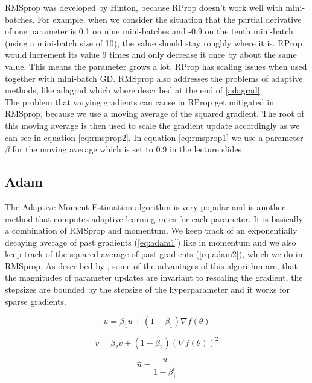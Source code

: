 \documentclass[aodsor,preprint]{imsart}
\numberwithin{equation}{section}
\theoremstyle{plain}
\begin{document}
RMSprop was developed by Hinton, because RProp doesn't work well with mini-batches. For example, when we consider the situation that the partial derivative of one parameter is 0.1 on nine mini-batches and -0.9 on the tenth mini-batch (using a mini-batch size of 10), the value should stay roughly where it is. RProp would increment its value 9 times and only decrease it once by about the same value. This means the parameter grows a lot, RProp has scaling issues when used together with mini-batch GD. RMSprop also addresses the problems of adaptive methods, like adagrad which where described at the end of \ref{adagrad}. \\
The problem that varying gradients can cause in RProp get mitigated in RMSprop, because we use a moving average of the squared gradient. The root of this moving average is then used to scale the gradient update accordingly as we can see in equation \ref{eq:rmsprop2}. In equation \ref{eq:rmsprop1} we use a parameter $\beta$ for the moving average which is set to 0.9 in the lecture slides.

\subsection{Adam}
The Adaptive Moment Estimation algorithm is very popular and is another method that computes adaptive learning rates for each parameter. It is basically a combination of RMSprop and momentum. We keep track of an exponentially decaying average of past gradients (\ref{eq:adam1}) like in momentum and we also keep track of the squared average of past gradients (\ref{eq:adam2}), which we do in RMSprop. As described by \cite{adam}, some of the advantages of this algorithm are, that the magnitudes of parameter updates are invariant to rescaling the gradient, the stepsizes are bounded by the stepsize of the hyperparameter and it works for sparse gradients.

\begin{equation} \label{eq:adam1}
u = \beta_{1} u + (1-\beta_{1}) \nabla f(\theta)
\end{equation} 

\begin{equation} \label{eq:adam2}
v = \beta_{2} v + (1-\beta_{2}) \left( \nabla f(\theta)\right)^2
\end{equation}

\begin{equation} \label{eq:adam3}
\hat{u} = \frac{u}{1-\beta_{1}^t}
\end{equation} 
\end{document}
